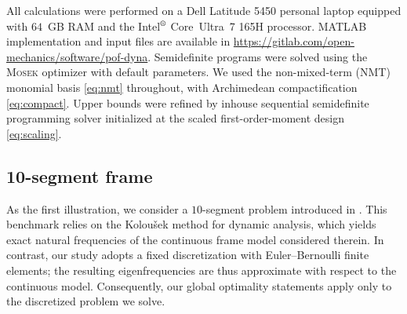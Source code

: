 \documentclass[preprint,3p]{elsarticle}
\numberwithin{equation}{section}
\begin{document}
All calculations were performed on a Dell Latitude 5450 personal laptop equipped with $64$~GB RAM and the Intel$^{\text{\textregistered}}$ Core\texttrademark~Ultra~7 165H processor. MATLAB implementation and input files are available in \href{https://gitlab.com/open-mechanics/software/pof-dyna}{https://gitlab.com/open-mechanics/software/pof-dyna}. Semidefinite programs were solved using the \textsc{Mosek} optimizer with default parameters. We used the non-mixed-term (NMT) monomial basis \eqref{eq:nmt} throughout, with Archimedean compactification \eqref{eq:compact}. Upper bounds were refined by inhouse sequential semidefinite programming solver initialized at the scaled first-order-moment design \eqref{eq:scaling}.

\subsection{10-segment frame}

As the first illustration, we consider a $10$-segment problem introduced in \citep[Section 5.1]{Ni2014}. This benchmark relies on the Koloušek method for dynamic analysis, which yields exact natural frequencies of the continuous frame model considered therein. In contrast, our study adopts a fixed discretization with Euler--Bernoulli finite elements; the resulting eigenfrequencies are thus approximate with respect to the continuous model. Consequently, our global optimality statements apply only to the discretized problem we solve.
\end{document}
